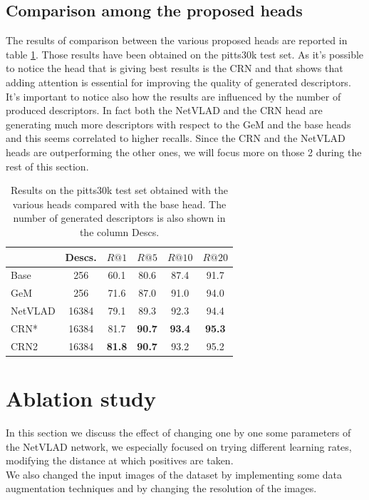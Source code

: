 \documentclass[10pt,twocolumn,letterpaper]{article}
\begin{document}
\subsection{Comparison among the proposed heads}
The results of comparison between the various proposed heads are reported in table \ref{tab:base_results}. Those results have 
been obtained on the pitts30k test set. As it's possible to notice the head that is giving best results is the CRN and that 
shows that adding attention is essential for improving the quality of generated descriptors. It's important to notice also how 
the results are influenced by the number of produced descriptors. In fact both the NetVLAD and the CRN head are generating much 
more descriptors with respect to the GeM and the base heads and this seems correlated to higher recalls. Since the CRN and the NetVLAD
heads are outperforming the other ones, we will focus more on those 2 during the rest of this section.

\begin{table}
   \centering
\begin{tabular}{|l|c|c|c|c|c|}
\hline
         & Descs.&        $R@1$   &        $R@5$   &        $R@10$  &        $R@20$   \\ \hline
Base     & 256   &         60.1   &         80.6   &          87.4   &          91.7   \\
GeM      & 256   &         71.6   &         87.0   &          91.0   &          94.0   \\
NetVLAD  & 16384 &         79.1   &         89.3   &          92.3   &          94.4   \\ \hline
CRN*     & 16384 &         81.7   & \textbf{90.7}  &  \textbf{93.4}  &  \textbf{95.3}  \\
CRN2     & 16384 &\textbf{81.8}   & \textbf{90.7}  &          93.2   &          95.2   \\ \hline
\end{tabular}
\caption{Results on the pitts30k test set obtained with the various heads compared with the base head. The number of generated descriptors 
is also shown in the column Descs.}
\label{tab:base_results}
\end{table}

\section{Ablation study}
In this section we discuss the effect of changing one by one some parameters of the NetVLAD network, we especially focused on trying different learning rates, modifying the distance at which positives are taken.\\ We also changed the input images of the dataset by implementing some data augmentation techniques and by changing the resolution of the images.
\end{document}
